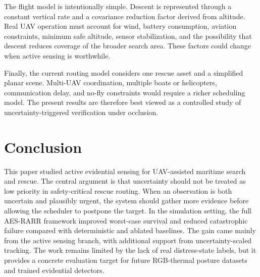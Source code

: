 \documentclass[runningheads]{llncs}
\newcommand{\aes}{AES-RARR}
\begin{document}
The flight model is intentionally simple. Descent is represented through a constant vertical rate and a covariance reduction factor derived from altitude. Real UAV operation must account for wind, battery consumption, aviation constraints, minimum safe altitude, sensor stabilization, and the possibility that descent reduces coverage of the broader search area. These factors could change when active sensing is worthwhile.

Finally, the current routing model considers one rescue asset and a simplified planar scene. Multi-UAV coordination, multiple boats or helicopters, communication delay, and no-fly constraints would require a richer scheduling model. The present results are therefore best viewed as a controlled study of uncertainty-triggered verification under occlusion.

\section{Conclusion}

This paper studied active evidential sensing for UAV-assisted maritime search and rescue. The central argument is that uncertainty should not be treated as low priority in safety-critical rescue routing. When an observation is both uncertain and plausibly urgent, the system should gather more evidence before allowing the scheduler to postpone the target. In the simulation setting, the full \aes{} framework improved worst-case survival and reduced catastrophic failure compared with deterministic and ablated baselines. The gain came mainly from the active sensing branch, with additional support from uncertainty-scaled tracking. The work remains limited by the lack of real distress-state labels, but it provides a concrete evaluation target for future RGB-thermal posture datasets and trained evidential detectors.
\end{document}

